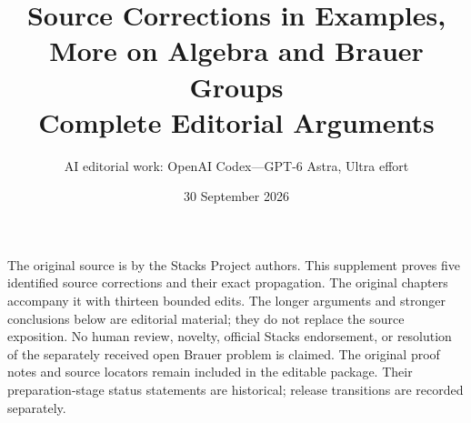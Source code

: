 \documentclass[11pt]{article}
\title{Source Corrections in Examples, More on Algebra and Brauer Groups\\Complete Editorial Arguments}
\author{AI editorial work: OpenAI Codex---GPT-6 Astra, Ultra effort}
\date{30 September 2026}
\begin{document}
\maketitle
\noindent
The original source is by the Stacks Project authors. This supplement
proves five identified source corrections and their exact propagation.
The original chapters accompany it with thirteen bounded edits. The
longer arguments and stronger conclusions below are editorial material;
they do not replace the source exposition. No human review, novelty,
official Stacks endorsement, or resolution of the separately received
open Brauer problem is claimed. The original proof notes and source
locators remain included in the editable package. Their preparation-stage
status statements are historical; release transitions are recorded separately.
\tableofcontents

\clearpage

\end{document}

